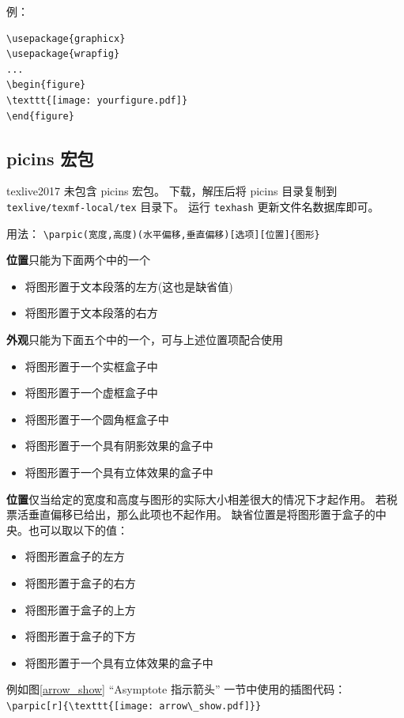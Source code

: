 \documentclass[a4paper,11pt]{article}
\begin{document}
例：
\begin{Verbatim}
\usepackage{graphicx}
\usepackage{wrapfig}
...
\begin{figure}
\texttt{[image: yourfigure.pdf]}
\end{figure}
\end{Verbatim}

\subsection{picins 宏包}
texlive2017 未包含 picins 宏包。
下载，解压后将 picins 目录复制到 \verb+texlive/texmf-local/tex+ 目录下。
运行 \verb+texhash+ 更新文件名数据库即可。

用法：%
\verb+\parpic(宽度,高度)(水平偏移,垂直偏移)[选项][位置]{图形}+

{\bf 位置}只能为下面两个中的一个
\begin{itemize}
	\item [l] 将图形置于文本段落的左方(这也是缺省值)
	\item [r] 将图形置于文本段落的右方
\end{itemize}

{\bf 外观}只能为下面五个中的一个，可与上述位置项配合使用
\begin{itemize}
	\item [f] 将图形置于一个实框盒子中
	\item [d] 将图形置于一个虚框盒子中
	\item [o] 将图形置于一个圆角框盒子中
	\item [s] 将图形置于一个具有阴影效果的盒子中
	\item [x] 将图形置于一个具有立体效果的盒子中	
\end{itemize}

{\bf 位置}仅当给定的宽度和高度与图形的实际大小相差很大的情况下才起作用。
若税票活垂直偏移已给出，那么此项也不起作用。
缺省位置是将图形置于盒子的中央。也可以取以下的值：
\begin{itemize}
	\item [l] 将图形置盒子的左方
	\item [r] 将图形置于盒子的右方
	\item [t] 将图形置于盒子的上方
	\item [b] 将图形置于盒子的下方
	\item [x] 将图形置于一个具有立体效果的盒子中	
\end{itemize}
例如图\ref{arrow_show} ``Asymptote 指示箭头'' 一节中使用的插图代码：\\
\verb+\parpic[r]{\texttt{[image: arrow\_show.pdf]}}+
\end{document}
